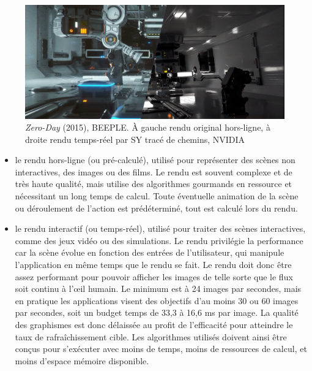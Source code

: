 \bigskip

\begin{figure}[h]
    \centering
    \includegraphics[width=\textwidth]{contenu/resources/images/zero_day_comparison}
    \caption[{\it Zero-Day} (2015), BEEPLE]{{\it Zero-Day} (2015), BEEPLE. À gauche rendu original hors-ligne, à droite rendu temps-réel par SY tracé de chemins, NVIDIA~\cite{ZeroDay}}
    \label{fig:zero-day}
\end{figure}

\begin{itemize}
    \item le rendu \og hors-ligne \fg (ou pré-calculé), utilisé pour représenter des scènes non interactives, des images ou des films. Le rendu est souvent complexe et de très haute qualité, mais utilise des algorithmes gourmands en ressource et nécessitant un long temps de calcul. Toute éventuelle animation de la scène ou déroulement de l'action est prédéterminé, tout est calculé lors du rendu.
    \item le rendu \og interactif \fg (ou temps-réel), utilisé pour traiter des scènes interactives, comme des jeux vidéo ou des simulations. Le rendu privilégie la performance car la scène évolue en fonction des entrées de l'utilisateur, qui manipule l'application en même temps que le rendu se fait. Le rendu doit donc être assez performant pour pouvoir afficher les images de telle sorte que le flux soit continu à l'œil humain. Le minimum est à 24 images par secondes, mais en pratique les applications visent des objectifs d'au moins 30 ou 60 images par secondes, soit un budget temps de 33,3 à 16,6 ms par image. La qualité des graphismes est donc délaissée au profit de l'efficacité pour atteindre le taux de rafraîchissement cible. Les algorithmes utilisés doivent ainsi être conçus pour s'exécuter avec moins de temps, moins de ressources de calcul, et moins d'espace mémoire disponible.
\end{itemize}

